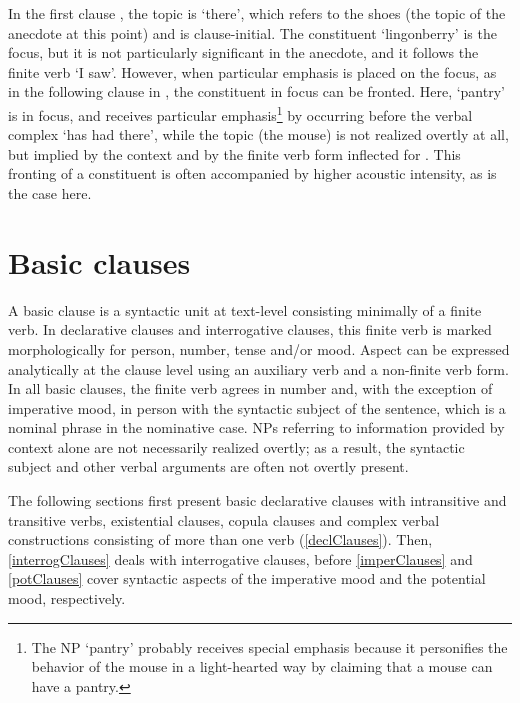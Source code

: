 In the first clause , the topic is  ‘there’, which refers to the shoes (the topic of the anecdote at this point) and is clause-initial. The constituent  ‘lingonberry’ is the focus, but it is not particularly significant in the anecdote, and it follows the finite verb  ‘I saw’. 
However, when particular emphasis is placed on the focus, as in the following clause in , the constituent in focus can be fronted. Here,  ‘pantry’ is in focus, and receives particular emphasis\footnote{The NP  ‘pantry’ probably receives special emphasis because it personifies the behavior of the mouse in a light-hearted way by claiming that a mouse can have a pantry.} by occurring before the verbal complex  ‘has had there’, while the topic (the mouse) is not realized overtly at all, but implied by the context and by the finite verb form inflected for . 
This fronting of a constituent is often accompanied by higher acoustic intensity, as is the case here.%






\chapter{Basic clauses}\label{basicClauses}
A basic clause is a syntactic unit at text-level consisting minimally of a finite verb. In declarative clauses and interrogative clauses, this finite verb is marked morphologically for person, number, tense and/or mood. Aspect can be expressed analytically at the clause level using an auxiliary verb and a non-finite verb form. 
In all basic clauses, the finite verb agrees in number and, with the exception of imperative mood, in person with the syntactic subject of the sentence, which is a nominal phrase in the nominative case. 
NPs referring to information provided by context alone are not necessarily realized overtly; as a result, the syntactic subject and other verbal arguments are often not overtly present. 

The following sections first present basic declarative clauses with intransitive and transitive verbs, existential clauses, copula clauses and complex verbal constructions consisting of more than one verb (\SEC\ref{declClauses}). Then, \SEC\ref{interrogClauses} deals with interrogative clauses, %
before \SEC\ref{imperClauses} and \SEC\ref{potClauses} cover syntactic aspects of the imperative mood and the potential mood, respectively.


